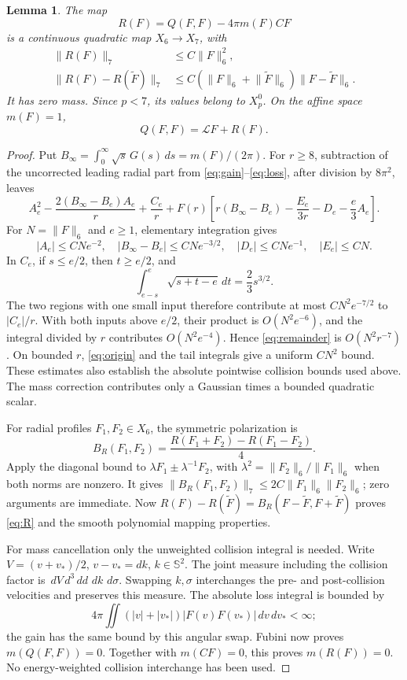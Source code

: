 \documentclass[11pt,a4paper]{article}
\numberwithin{equation}{section}
\newtheorem{lemma}[theorem]{Lemma}
\theoremstyle{remark}
\newcommand{\Sph}{\mathbb S}
\newcommand{\calL}{\mathcal L}
\newcommand{\dd}{\,d}
\newcommand{\norm}[2]{\lVert #1\rVert_{#2}}
\begin{document}
\begin{lemma}\label{lem:remainder}
The map
\[
 R(F)=Q(F,F)-4\pi m(F)CF
\]
is a continuous quadratic map \(X_6\to X_7\), with
\begin{align}
 \norm{R(F)}{7}&\leq C\norm{F}{6}^2,\nonumber\\
 \norm{R(F)-R(\widetilde F)}{7}
 &\leq C(\norm{F}{6}+\norm{\widetilde F}{6})
                \norm{F-\widetilde F}{6}.\label{eq:R}
\end{align}
It has zero mass. Since \(p<7\), its values belong to \(X_p^0\).
On the affine space \(m(F)=1\),
\begin{equation}\label{eq:split}
 Q(F,F)=\calL F+R(F).
\end{equation}
\end{lemma}
\begin{proof}
Put \(B_\infty=\int_0^\infty\sqrt s\,G(s)\dd s=m(F)/(2\pi)\).
For \(r\geq8\), subtraction of the uncorrected leading radial part from
\eqref{eq:gain}--\eqref{eq:loss}, after division by \(8\pi^2\), leaves
\begin{equation}\label{eq:remainder}
 A_e^2-\frac{2(B_\infty-B_e)A_e}{r}+\frac{C_e}{r}
 +F(r)\left[r(B_\infty-B_e)-\frac{E_e}{3r}-D_e-\frac e3A_e\right].
\end{equation}
For \(N=\norm{F}{6}\) and \(e\geq1\), elementary integration gives
\[
 |A_e|\leq CNe^{-2},\quad
 |B_\infty-B_e|\leq CNe^{-3/2},\quad
 |D_e|\leq CNe^{-1},\quad |E_e|\leq CN.
\]
In \(C_e\), if \(s\leq e/2\), then \(t\geq e/2\), and
\[
 \int_{e-s}^e\sqrt{s+t-e}\dd t=\frac23s^{3/2}.
\]
The two regions with one small input therefore contribute at most
\(CN^2e^{-7/2}\) to \(|C_e|/r\). With both inputs above \(e/2\), their
product is \(O(N^2e^{-6})\), and the integral divided by \(r\) contributes
\(O(N^2e^{-4})\). Hence \eqref{eq:remainder} is \(O(N^2r^{-7})\).
On bounded \(r\), \eqref{eq:origin} and the tail integrals give a
uniform \(CN^2\) bound. These estimates also establish the absolute
pointwise collision bounds used above. The mass correction contributes
only a Gaussian times a bounded quadratic scalar.

For radial profiles \(F_1,F_2\in X_6\), the symmetric polarization is
\[
 B_R(F_1,F_2)=\frac{R(F_1+F_2)-R(F_1-F_2)}4.
\]
Apply the diagonal bound to \(\lambda F_1\pm\lambda^{-1}F_2\), with
\(\lambda^2=\norm{F_2}{6}/\norm{F_1}{6}\) when both norms are nonzero.
It gives \(\norm{B_R(F_1,F_2)}{7}\leq
2C\norm{F_1}{6}\norm{F_2}{6}\); zero arguments are immediate.
Now \(R(F)-R(\widetilde F)=B_R(F-\widetilde F,F+\widetilde F)\)
proves \eqref{eq:R} and the smooth polynomial mapping properties.

For mass cancellation only the unweighted collision integral is needed.
Write \(V=(v+v_*)/2\), \(v-v_*=dk\), \(k\in\Sph^2\). The joint measure
including the collision factor is
\(\dd V\,d^3\dd d\,\dd k\,\dd\sigma\). Swapping \(k,\sigma\)
interchanges the pre- and post-collision velocities and preserves this
measure. The absolute loss integral is bounded by
\[
 4\pi\iint (|v|+|v_*|)|F(v)F(v_*)|\dd v\dd v_*<\infty;
\]
the gain has the same bound by this angular swap. Fubini now proves
\(m(Q(F,F))=0\). Together with \(m(CF)=0\), this proves \(m(R(F))=0\).
No energy-weighted collision interchange has been used.
\end{proof}
\end{document}

